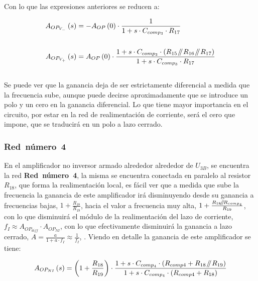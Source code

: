 Con lo que las expresiones anteriores se reducen a:

\begin{align}
\begin{split}
A_{OP_{V_{-}}}\left( s \right) &= - A_{OP}\left( 0 \right) \cdot \frac{1}{1 + s \cdot C_{comp_{3}} \cdot R_{17} }
\\\\
A_{OP_{V_{+}}}\left( s \right) &= A_{OP}\left( 0 \right) \cdot \frac{ 1 + s \cdot C_{comp_{3}} \cdot \left(  R_{15} \mathbin{\!/\mkern-5mu/\!} R_{16} \mathbin{\!/\mkern-5mu/\!} R_{17}   \right) }{1 + s \cdot C_{comp_{3}} \cdot R_{17} }
\end{split}
\end{align}\\

Se puede ver que la ganancia deja de ser estrictamente diferencial a medida que la frecuencia sube, aunque puede decirse aproximadamente que se introduce un polo  y un cero en la ganancia diferencial. Lo que tiene mayor importancia en el circuito, por estar en la red de realimentación de corriente, será el cero que impone, que se traducirá en un polo a lazo cerrado.


\subsubsection{\textbf{Red~número~4}}

En el amplificador no inversor armado alrededor alrededor de $U_{3B}$, se encuentra la red \textbf{Red~número~4}, la misma se encuentra conectada en paralelo al resistor $R_{18}$, que forma la realimentación local, es fácil ver que a medida que sube la frecuencia la ganancia de este amplificador irá disminuyendo desde su ganancia a frecuencias bajas, $1 + \frac{R_{18}}{R_{19}}$, hacia el valor a frecuencia muy alta, $1 + \frac{R_{18} \mathbin{\!/\mkern-5mu/\!} R_{comp_{4}}}{R_{19}}$, con lo que disminuirá el módulo de la realimentación del lazo de corriente, $f_{I} \approx A_{OP_{diff}} \cdot A_{OP_{NI}}$, con lo que efectivamente disminuirá la ganancia a lazo cerrado, $ A = \frac{a}{1 + a \cdot f_{I}} \approx \frac{1}{f_{I}}$, . Viendo en detalle la ganancia de este amplificador se tiene:

\begin{equation}
A_{OP_{NI}}\left( s \right) = \left( 1 + \frac{ R_{18} }{ R_{19} } \right) \cdot \frac{ 1 + s \cdot C_{comp_{4}} \cdot \left(  R_{comp4} + R_{18} \mathbin{\!/\mkern-5mu/\!} R_{19}  \right)  }{1+ s \cdot C_{comp_{4}} \cdot \left( R_{comp4} + R_{18} \right) }
\end{equation}\\

